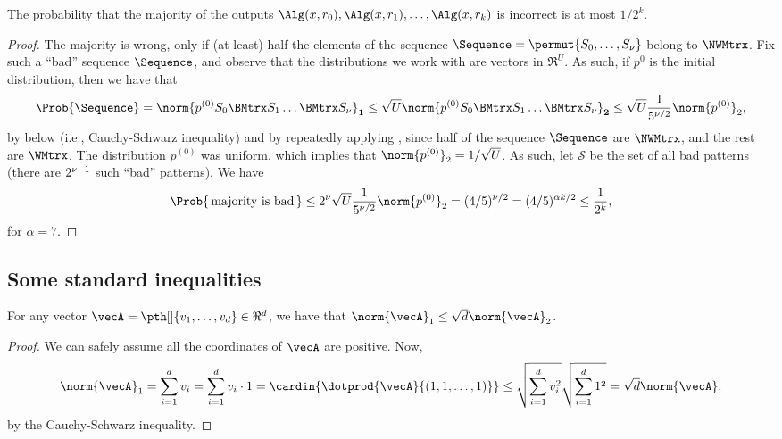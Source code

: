 \begin{theorem}
    The probability that the majority of the outputs $\Alg(x,r_0),
    \Alg(x,r_1), \ldots, \Alg(x,r_k)$ is incorrect is at most $1/2^k$.
\end{theorem}
\begin{proof}
    The majority is wrong, only if (at least) half the elements of the
    sequence $\Sequence = \permut{S_0, \ldots, S_\altK}$ belong to
    $\NWMtrx$. Fix such a ``bad'' sequence $\Sequence$, and observe
    that the distributions we work with are vectors in $\Re^U$. As
    such, if $p^{0}$ is the initial distribution, then we have that
    \begin{equation*}
        \Prob{\bigl. \Sequence}%
        =%
        \norm{p^{(0)} S_0 \BMtrx S_1 \ldots \BMtrx S_\altK}_{\mathbf{1}
           }%
        \leq%
        \sqrt{U} \norm{p^{(0)} S_0 \BMtrx S_1 \ldots \BMtrx
           S_\altK}_{\mathbf{2}} \leq%
        \sqrt{U}\frac{1}{5^{\altK/2}} \norm{p^{(0)}}_2,
    \end{equation*}
    by  below (i.e., Cauchy-Schwarz inequality) and
    by repeatedly applying , since half of the
    sequence $\Sequence$ are $\NWMtrx$, and the rest are $\WMtrx$.
    The distribution $p^{(0)}$ was uniform, which implies that
    $\norm{p^{(0)} }_2 = 1/\sqrt{U}$. As such, let $\mathcal{S}$ be
    the set of all bad patterns (there are $2^{\nu-1}$ such ``bad''
    patterns).  We have
    \begin{equation*}
        \Prob{\Bigl.\, \text{majority is bad}\, }%
        \leq%
        2^\altK \sqrt{U} \frac{1}{5^{\altK/2}} \norm{p^{(0)}}_2%
        =%
        (4/5)^{\altK/2} = (4/5)^{\alpha k/2} \leq \frac{1}{2^k},
    \end{equation*}
    for $\alpha = 7$.
\end{proof}


\subsection{Some standard inequalities}

\begin{lemma}
    For any vector $\vecA = \pth[]{v_1,\ldots, v_d} \in \Re^d$, we
    have that $\norm{\vecA}_1 \leq \sqrt{d} \norm{\vecA}_2$.
\end{lemma}

\begin{proof}
    We can safely assume all the coordinates of $\vecA$ are positive.
    Now, 
    \begin{equation*}
        \norm{\vecA}_1%
        =%
        \sum_{i=1}^d {v_i}%
        =%
        \sum_{i=1}^d {v_i} \cdot 1 %
        =%
        \cardin{\dotprod{\vecA}{(1,1, \ldots, 1)}} \leq%
        \sqrt{\sum_{i=1}^d v_i^2 } \sqrt{\sum_{i=1}^d 1^2}%
        =%
        \sqrt{d} \norm{\bigl.\vecA},
    \end{equation*}
    by the Cauchy-Schwarz inequality.
\end{proof}


